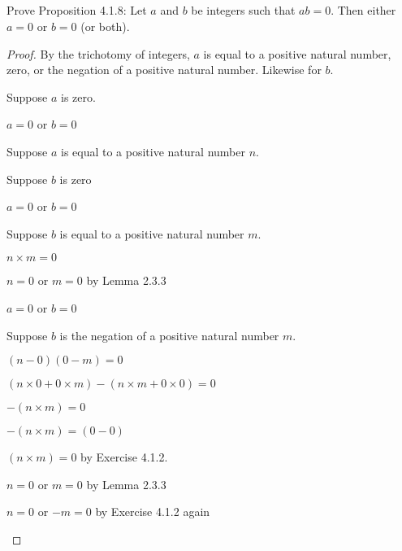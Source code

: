 \documentclass[../../main.tex]{subfiles}
\begin{document}
\subsection{}
\begin{q}
    Prove Proposition 4.1.8: Let $a$ and $b$ be integers such that $ab = 0$. Then either $a = 0$ or $b = 0$ (or both).
\end{q}
\begin{proof}
    By the trichotomy of integers, $a$ is equal to a positive natural number, zero, or the negation of a positive natural number. Likewise for $b$.
    \begin{lxl}
        \item Suppose $a$ is zero.
        \begin{lxl}
            \item $a = 0$ or $b = 0$
        \end{lxl}
        \item Suppose $a$ is equal to a positive natural number $n$.
        \begin{lxl}
            \item Suppose $b$ is zero
            \begin{lxl}
                \item $a = 0$ or $b = 0$
            \end{lxl}
            \item Suppose $b$ is equal to a positive natural number $m$.
            \begin{lxl}
                \item $n \times m = 0$ 
                \item $n = 0$ or $m = 0$ by Lemma 2.3.3
                \item $a = 0$ or $b = 0$  
            \end{lxl}
            \item Suppose $b$ is the negation of a positive natural number $m$.
            \item $(n-0)(0-m)=0$
            \item $(n \times 0 + 0 \times m) - (n \times m + 0 \times 0) = 0$
            \item $-(n \times m)=0$
            \item $-(n \times m)=(0-0)$
            \item $(n \times m)=0$ by Exercise 4.1.2.
            \item $n = 0$ or $m = 0$ by Lemma 2.3.3
            \item $n = 0$ or $-m = 0$ by Exercise 4.1.2 again

\end{lxl}
\end{lxl}
\end{proof}
\end{document}
